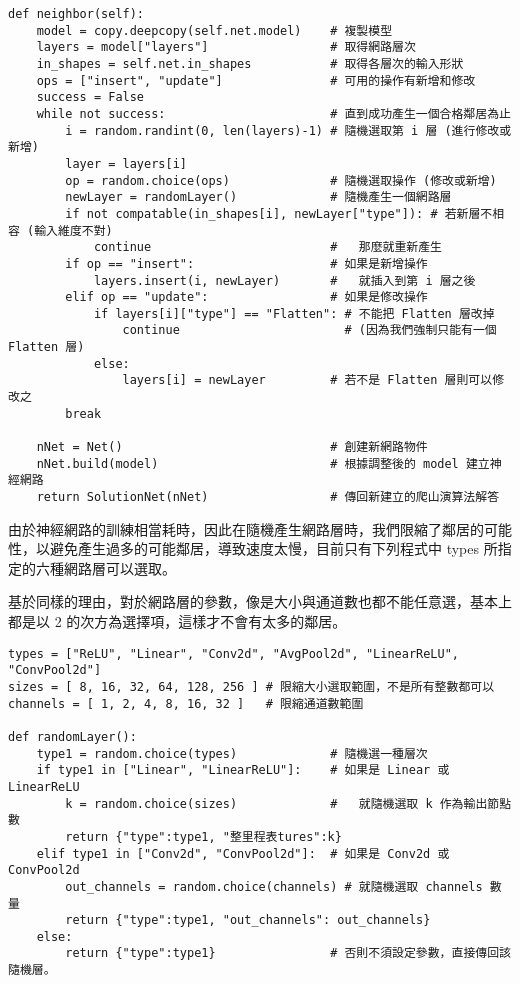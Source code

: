 \documentclass{article}
\begin{document}
\begin{minipage}{\linewidth}
\begin{lstlisting}
def neighbor(self):
    model = copy.deepcopy(self.net.model)    # 複製模型
    layers = model["layers"]                 # 取得網路層次
    in_shapes = self.net.in_shapes           # 取得各層次的輸入形狀
    ops = ["insert", "update"]               # 可用的操作有新增和修改
    success = False
    while not success:                       # 直到成功產生一個合格鄰居為止
        i = random.randint(0, len(layers)-1) # 隨機選取第 i 層 (進行修改或新增)
        layer = layers[i]
        op = random.choice(ops)              # 隨機選取操作 (修改或新增)
        newLayer = randomLayer()             # 隨機產生一個網路層
        if not compatable(in_shapes[i], newLayer["type"]): # 若新層不相容 (輸入維度不對)
            continue                         #   那麼就重新產生
        if op == "insert":                   # 如果是新增操作
            layers.insert(i, newLayer)       #   就插入到第 i 層之後
        elif op == "update":                 # 如果是修改操作
            if layers[i]["type"] == "Flatten": # 不能把 Flatten 層改掉
                continue                       # (因為我們強制只能有一個 Flatten 層)
            else:
                layers[i] = newLayer         # 若不是 Flatten 層則可以修改之
        break

    nNet = Net()                             # 創建新網路物件
    nNet.build(model)                        # 根據調整後的 model 建立神經網路
    return SolutionNet(nNet)                 # 傳回新建立的爬山演算法解答
\end{lstlisting}
\end{minipage}

由於神經網路的訓練相當耗時，因此在隨機產生網路層時，我們限縮了鄰居的可能性，以避免產生過多的可能鄰居，導致速度太慢，目前只有下列程式中 types 所指定的六種網路層可以選取。

基於同樣的理由，對於網路層的參數，像是大小與通道數也都不能任意選，基本上都是以 2 的次方為選擇項，這樣才不會有太多的鄰居。

\begin{minipage}{\linewidth}
\begin{lstlisting}
types = ["ReLU", "Linear", "Conv2d", "AvgPool2d", "LinearReLU", "ConvPool2d"]
sizes = [ 8, 16, 32, 64, 128, 256 ] # 限縮大小選取範圍，不是所有整數都可以
channels = [ 1, 2, 4, 8, 16, 32 ]   # 限縮通道數範圍

def randomLayer():
    type1 = random.choice(types)             # 隨機選一種層次
    if type1 in ["Linear", "LinearReLU"]:    # 如果是 Linear 或 LinearReLU
        k = random.choice(sizes)             #   就隨機選取 k 作為輸出節點數
        return {"type":type1, "整里程表tures":k}
    elif type1 in ["Conv2d", "ConvPool2d"]:  # 如果是 Conv2d 或 ConvPool2d
        out_channels = random.choice(channels) # 就隨機選取 channels 數量
        return {"type":type1, "out_channels": out_channels}
    else:                                    
        return {"type":type1}                # 否則不須設定參數，直接傳回該隨機層。
\end{lstlisting}
\end{minipage}
\end{document}
